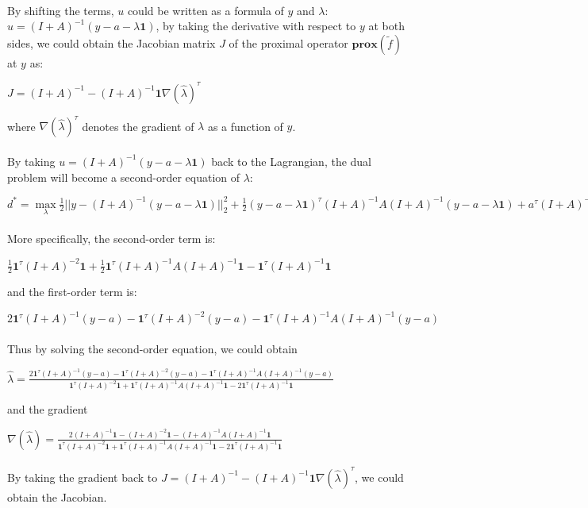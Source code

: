 \documentclass{article}
\begin{document}
\paragraph{}By shifting the terms, $u$ could be written as a formula of $y$ and $\lambda$: $u = (I+A)^{-1}(y-a-\lambda\textbf{1})$, by taking the derivative with respect to $y$ at both sides, we could obtain the Jacobian matrix $J$ of the proximal operator $\textbf{prox}(\tilde{f})$ at $y$ as:
\begin{center}
$J = (I+A)^{-1} -(I+A)^{-1}\textbf{1}\nabla(\hat{\lambda})^{\tau}$
\end{center}
where $\nabla(\hat{\lambda})^{\tau}$ denotes the gradient of $\lambda$ as a function of $y$.
\paragraph{}By taking $u = (I+A)^{-1}(y-a-\lambda\textbf{1})$ back to the Lagrangian, the dual problem will become a second-order equation of $\lambda$:
\begin{center}
$d^{*} = \max\limits_{\lambda} \frac{1}{2}||y-(I+A)^{-1}(y-a-\lambda\textbf{1})||_{2}^{2}+\frac{1}{2}(y-a-\lambda\textbf{1})^{\tau}(I+A)^{-1}A(I+A)^{-1}(y-a-\lambda\textbf{1})+a^{\tau}(I+A)^{-1}(y-a-\lambda\textbf{1})+\lambda\textbf{1}^{\tau}(I+A)^{-1}(y-a-\lambda\textbf{1})$
\end{center}
\paragraph{}More specifically, the second-order term is:
\begin{center}
$\frac{1}{2}\textbf{1}^{\tau}(I+A)^{-2}\textbf{1}+\frac{1}{2}\textbf{1}^{\tau}(I+A)^{-1}A(I+A)^{-1}\textbf{1}-\textbf{1}^{\tau}(I+A)^{-1}\textbf{1}$
\end{center}
and the first-order term is:
\begin{center}
$2\textbf{1}^{\tau}(I+A)^{-1}(y-a)-\textbf{1}^{\tau}(I+A)^{-2}(y-a)-\textbf{1}^{\tau}(I+A)^{-1}A(I+A)^{-1}(y-a)$
\end{center}
\paragraph{}Thus by solving the second-order equation, we could obtain
\begin{center}
$\hat{\lambda} = \frac{2\textbf{1}^{\tau}(I+A)^{-1}(y-a)-\textbf{1}^{\tau}(I+A)^{-2}(y-a)-\textbf{1}^{\tau}(I+A)^{-1}A(I+A)^{-1}(y-a)}{\textbf{1}^{\tau}(I+A)^{-2}\textbf{1}+\textbf{1}^{\tau}(I+A)^{-1}A(I+A)^{-1}\textbf{1}-2\textbf{1}^{\tau}(I+A)^{-1}\textbf{1}}$
\end{center}
and the gradient
\begin{center}
$\nabla(\hat{\lambda}) = \frac{2(I+A)^{-1}\textbf{1}-(I+A)^{-2}\textbf{1}-(I+A)^{-1}A(I+A)^{-1}\textbf{1}}{\textbf{1}^{\tau}(I+A)^{-2}\textbf{1}+\textbf{1}^{\tau}(I+A)^{-1}A(I+A)^{-1}\textbf{1}-2\textbf{1}^{\tau}(I+A)^{-1}\textbf{1}}$
\end{center}
\paragraph{}By taking the gradient back to $J = (I+A)^{-1} -(I+A)^{-1}\textbf{1}\nabla(\hat{\lambda})^{\tau}$, we could obtain the Jacobian.
\end{document}
